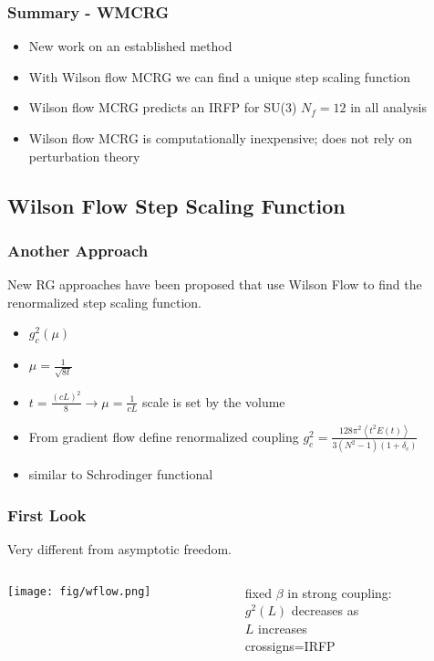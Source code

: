 \documentclass{beamer}
\begin{document}
  \begin{frame}
    \frametitle{Summary - WMCRG}
    \begin{itemize}
      \item New work on an established method
      \item With Wilson flow MCRG we can find a unique step scaling function
      \item Wilson flow MCRG predicts an IRFP for SU(3) $N_f=12$ in all analysis
      \item Wilson flow MCRG is computationally inexpensive; does not rely on perturbation theory
    \end{itemize}
  \end{frame}

  \subsection{Wilson Flow Step Scaling Function}
  \addtocounter{framenumber}{-1}

  \begin{frame}
    \frametitle{Another Approach}
    New RG approaches have been proposed that use Wilson Flow to find the renormalized step scaling function.
    \begin{itemize}
      \item $g_c^2(\mu)$
      \item $\mu = \frac{1}{\sqrt{8t}}$
      \item $t = \frac{(cL)^2}{8} \rightarrow \mu = \frac{1}{cL}$ scale is set by the volume
      \item From gradient flow define renormalized coupling $g_c^2=\frac{128\pi^2\left<t^2E(t)\right>}{3(N^2-1)(1+\delta_c)}$
      \item similar to Schrodinger functional
    \end{itemize}
  \end{frame}

  \begin{frame}
    \frametitle{First Look}
    Very different from asymptotic freedom.
    \begin{columns}
      \begin{column}{0.7\textwidth}
        \texttt{[image: fig/wflow.png]}
      \end{column}
      \begin{column}{0.3\textwidth}
        \begin{centering}
          \vspace{12pt}
          fixed $\beta$ in strong coupling:\\
          $g^2(L)$ decreases as\\
          $L$ increases\\
          crossigns=IRFP\\
        \end{centering}
      \end{column}
    \end{columns}
  \end{frame}
\end{document}
